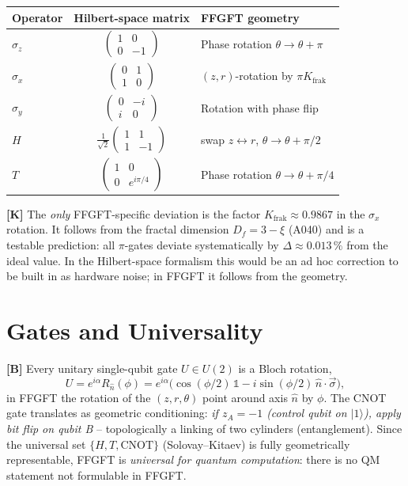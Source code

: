 \begin{center}
\renewcommand{\arraystretch}{1.4}
{\small
\begin{tabular}{lcl}
\toprule
\textbf{Operator} & \textbf{Hilbert-space matrix} & \textbf{FFGFT geometry} \\
\midrule
$\sigma_z$ & $\begin{pmatrix}1&0\\0&-1\end{pmatrix}$ & Phase rotation $\theta\to\theta+\pi$ \\
$\sigma_x$ & $\begin{pmatrix}0&1\\1&0\end{pmatrix}$ & $(z,r)$-rotation by $\pi K_{\text{frak}}$ \\
$\sigma_y$ & $\begin{pmatrix}0&-i\\i&0\end{pmatrix}$ & Rotation with phase flip \\
$H$ & $\tfrac{1}{\sqrt2}\begin{pmatrix}1&1\\1&-1\end{pmatrix}$ & swap $z\leftrightarrow r$, $\theta\to\theta+\pi/2$ \\
$T$ & $\begin{pmatrix}1&0\\0&e^{i\pi/4}\end{pmatrix}$ & Phase rotation $\theta\to\theta+\pi/4$ \\
\bottomrule
\end{tabular}
}
\renewcommand{\arraystretch}{1.0}
\end{center}

\textbf{[K]} The \emph{only} FFGFT-specific deviation is the factor
$K_{\text{frak}}\approx0{.}9867$ in the $\sigma_x$ rotation. It follows from the
fractal dimension $D_f = 3-\xi$ (A040) and is a testable prediction: all
$\pi$-gates deviate systematically by $\Delta\approx0{.}013\,\%$ from the ideal
value. In the Hilbert-space formalism this would be an ad hoc correction to be
built in as hardware noise; in FFGFT it follows from the geometry.

\section{Gates and Universality}

\textbf{[B]} Every unitary single-qubit gate $U\in U(2)$ is a Bloch rotation,
\[
  U = e^{i\alpha}R_{\hat n}(\phi)
    = e^{i\alpha}\bigl(\cos(\phi/2)\,\mathbb{1} - i\sin(\phi/2)\,\hat n\cdot\vec\sigma\bigr),
\]
in FFGFT the rotation of the $(z,r,\theta)$ point around axis $\hat n$ by $\phi$.
The CNOT gate translates as geometric conditioning: \emph{if $z_A=-1$ (control
qubit on $|1\rangle$), apply bit flip on qubit B} -- topologically a linking of
two cylinders (entanglement). Since the universal set $\{H,T,\text{CNOT}\}$
(Solovay--Kitaev) is fully geometrically representable, FFGFT is \emph{universal
for quantum computation}: there is no QM statement not formulable in FFGFT.

